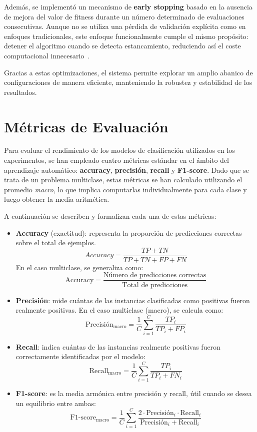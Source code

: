 Además, se implementó un mecanismo de \textbf{early stopping} basado en la ausencia de mejora del valor de fitness durante
un número determinado de evaluaciones consecutivas.
Aunque no se utiliza una pérdida de validación explícita como en enfoques tradicionales, este enfoque funcionalmente cumple el mismo propósito:
detener el algoritmo cuando se detecta estancamiento, reduciendo así el coste computacional innecesario~\cite{EarlyStoppingDiscussion2024}.

Gracias a estas optimizaciones, el sistema permite explorar un amplio abanico de configuraciones de manera eficiente, manteniendo la robustez y estabilidad de los resultados.


\section{Métricas de Evaluación}\label{sec:metricas-evaluacion}
Para evaluar el rendimiento de los modelos de clasificación utilizados en los experimentos,
se han empleado cuatro métricas estándar en el ámbito del aprendizaje automático: \textbf{accuracy}, \textbf{precisión}, \textbf{recall} y \textbf{F1-score}.
Dado que se trata de un problema multiclase, estas métricas se han calculado utilizando el promedio \textit{macro},
lo que implica computarlas individualmente para cada clase y luego obtener la media aritmética.

A continuación se describen y formalizan cada una de estas métricas:

\begin{itemize}
      \item \textbf{Accuracy} (exactitud): representa la proporción de predicciones correctas sobre el total de ejemplos.
            $$
                  Accuracy = \frac{TP + TN}{TP + TN + FP + FN}
            $$
            En el caso multiclase, se generaliza como:
            $$
                  \mathrm{Accuracy} = \frac{\text{Número de predicciones correctas}}{\text{Total de predicciones}}
            $$

      \item \textbf{Precisión}: mide cuántas de las instancias clasificadas como positivas fueron realmente positivas.
            En el caso multiclase (macro), se calcula como:
            $$
                  \text{Precisión}_{\text{macro}} = \frac{1}{C} \sum_{i=1}^{C} \frac{TP_i}{TP_i + FP_i}
            $$

      \item \textbf{Recall}: indica cuántas de las instancias realmente positivas fueron correctamente identificadas por el modelo:
            $$
                  \mathrm{Recall}_{\text{macro}} = \frac{1}{C} \sum_{i=1}^{C} \frac{TP_i}{TP_i + FN_i}
            $$

      \item \textbf{F1-score}: es la media armónica entre precisión y recall, útil cuando se desea un equilibrio entre ambas:
            $$
                  \mathrm{F1\text{-}score}_{\text{macro}} = \frac{1}{C} \sum_{i=1}^{C} \frac{2 \cdot \text{Precisión}_i \cdot \text{Recall}_i}{\text{Precisión}_i + \text{Recall}_i}
            $$
\end{itemize}

